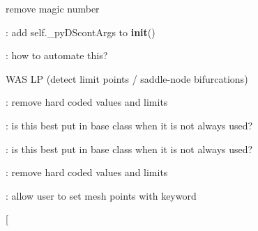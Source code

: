 \begin{DoxyRefList}
remove magic number  
\item[\label{todo__todo000048}%
\Hypertarget{todo__todo000048}%
Global \hyperlink{class_mu_mo_t_1_1_mu_mo_t_1_1_mu_mo_tbifurcation_view_aa56e2cffc879be68fdec55f29334415c}{Mu\+Mo\+Tbifurcation\+View.\+\_\+py\+D\+Scont\+Args} ]\+: add self.\+\_\+py\+D\+Scont\+Args to {\bfseries init}()  
\item[\label{todo__todo000049}%
\Hypertarget{todo__todo000049}%
Global \hyperlink{class_mu_mo_t_1_1_mu_mo_t_1_1_mu_mo_tbifurcation_view_a0a7557ffe670b6a318afa8bd9851d2fc}{Mu\+Mo\+Tbifurcation\+View.Max\+Step\+Size} ]\+: how to automate this?  
\item[\label{todo__todo000050}%
\Hypertarget{todo__todo000050}%
Global \hyperlink{class_mu_mo_t_1_1_mu_mo_t_1_1_mu_mo_tbifurcation_view_a040a7ecbcbaca807aeaec6d5c81801d5}{Mu\+Mo\+Tbifurcation\+View.Save\+Eigen} ]W\+AS \textquotesingle{}LP\textquotesingle{} (detect limit points / saddle-\/node bifurcations)  
\item[\label{todo__todo000022}%
\Hypertarget{todo__todo000022}%
Global \hyperlink{class_mu_mo_t_1_1_mu_mo_t_1_1_mu_mo_tcontroller_a7f7ea1e7e5688cb25a6651783db498e0}{Mu\+Mo\+Tcontroller.\+\_\+plot\+Limits\+Widget} ]\+: remove hard coded values and limits  
\item[\label{todo__todo000020}%
\Hypertarget{todo__todo000020}%
Global \hyperlink{class_mu_mo_t_1_1_mu_mo_t_1_1_mu_mo_tcontroller_a018864aa22d2adb0d3958fb0adbce8e2}{Mu\+Mo\+Tcontroller.\+\_\+progress\+Bar} ]\+: is this best put in base class when it is not always used?  
\item[\label{todo__todo000021}%
\Hypertarget{todo__todo000021}%
Global \hyperlink{class_mu_mo_t_1_1_mu_mo_t_1_1_mu_mo_tcontroller_a1da52cde6b2b94a1005eaa6898d2f8c5}{Mu\+Mo\+Tcontroller.\+\_\+progress\+Bar\+\_\+multi} ]\+: is this best put in base class when it is not always used?  
\item[\label{todo__todo000023}%
\Hypertarget{todo__todo000023}%
Global \hyperlink{class_mu_mo_t_1_1_mu_mo_t_1_1_mu_mo_tcontroller_ab1e13c5ff312caa1398f9de296be2319}{Mu\+Mo\+Tcontroller.\+\_\+system\+Size\+Widget} ]\+: remove hard coded values and limits  
\item[\label{todo__todo000038}%
\Hypertarget{todo__todo000038}%
Global \hyperlink{class_mu_mo_t_1_1_mu_mo_t_1_1_mu_mo_tfield_view_a0f5fba57766067c941f5a96b22545ed4}{Mu\+Mo\+Tfield\+View.\+\_\+\+Xdot} ]\+: allow user to set mesh points with keyword  
\item[\label{todo__todo000006}%
%

\end{DoxyRefList}
